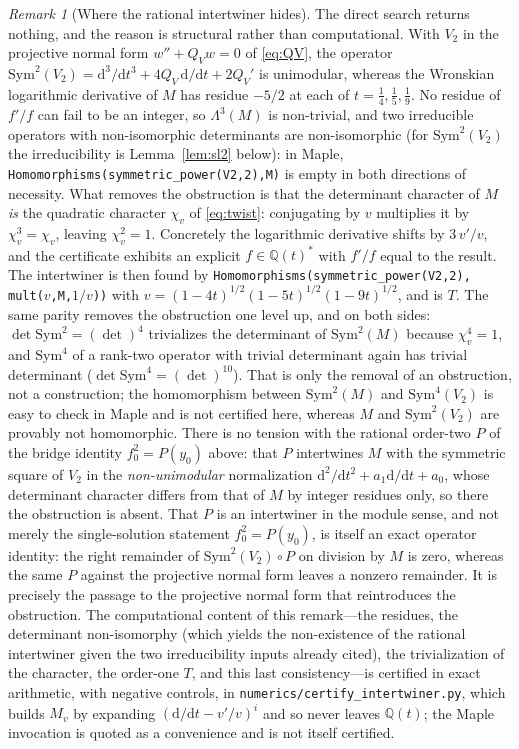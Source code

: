 \documentclass[cntp]{ipart}
\newcommand{\rmd}{\mathrm{d}}
\theoremstyle{plain}
\theoremstyle{remark}
\newtheorem{rem}[thm]{Remark}
\begin{document}
\begin{rem}[Where the rational intertwiner hides]
\label{rem:obstruction}
The direct search returns nothing, and the reason is structural rather than computational. With $V_2$ in the
projective normal form $w''+Q_Vw=0$ of \eqref{eq:QV}, the operator
$\mathrm{Sym}^2(V_2)=\rmd^3/\rmd t^3+4Q_V\,\rmd/\rmd t+2Q_V'$ is unimodular, whereas the Wronskian
logarithmic derivative of $M$ has residue $-5/2$ at each of $t=\tfrac14,\tfrac15,\tfrac19$. No residue of
$f'/f$ can fail to be an integer, so $\Lambda^3(M)$ is non-trivial, and two irreducible operators with
non-isomorphic determinants are non-isomorphic (for $\mathrm{Sym}^2(V_2)$ the irreducibility is
Lemma~\ref{lem:sl2} below): in Maple,
\texttt{Homomorphisms(symmetric\_power(V2,2),M)} is empty in both directions of necessity. What removes the
obstruction is that the determinant character of $M$ \emph{is} the quadratic character $\chi_v$ of
\eqref{eq:twist}: conjugating by $v$ multiplies it by $\chi_v^3=\chi_v$, leaving $\chi_v^2=1$. Concretely the
logarithmic derivative shifts by $3\,v'/v$, and the certificate exhibits an explicit $f\in\mathbb{Q}(t)^*$ with
$f'/f$ equal to the result. The intertwiner is then found by
\texttt{Homomorphisms(symmetric\_power(V2,2),\,mult($v$,M,$1/v$))} with
$v=(1-4t)^{1/2}(1-5t)^{1/2}(1-9t)^{1/2}$, and is $T$. The same parity removes the obstruction one level up, and
on both sides: $\det\mathrm{Sym}^2=(\det)^4$ trivializes the determinant of $\mathrm{Sym}^2(M)$ because
$\chi_v^4=1$, and $\mathrm{Sym}^4$ of a rank-two operator with trivial determinant again has trivial determinant
($\det\mathrm{Sym}^4=(\det)^{10}$).
That is only the removal of an obstruction, not a construction; the homomorphism between
$\mathrm{Sym}^2(M)$ and $\mathrm{Sym}^4(V_2)$ is easy to check in Maple and is not certified here,
whereas $M$ and $\mathrm{Sym}^2(V_2)$ are provably not homomorphic. There is no tension with the rational
order-two $P$ of the bridge identity
$f_0^2=P(y_0)$ above: that $P$ intertwines $M$ with the symmetric square of $V_2$ in the \emph{non-unimodular}
normalization $\rmd^2/\rmd t^2+a_1\rmd/\rmd t+a_0$, whose determinant character differs from that of $M$ by
integer residues only, so there the obstruction is absent. That $P$ is an intertwiner in the module sense,
and not merely the single-solution statement $f_0^2=P(y_0)$, is itself an exact operator identity: the right
remainder of $\mathrm{Sym}^2(V_2)\circ P$ on division by $M$ is zero, whereas the same $P$ against the
projective normal form leaves a nonzero remainder. It is precisely the passage to the projective
normal form that reintroduces the obstruction. The computational content of this remark---the residues, the
determinant non-isomorphy (which yields the non-existence of the rational intertwiner given the two
irreducibility inputs already cited), the trivialization of the character, the order-one $T$, and this
last consistency---is certified in exact arithmetic, with negative controls, in
\texttt{numerics/certify\_intertwiner.py}, which builds $M_v$ by expanding $(\rmd/\rmd t-v'/v)^i$ and so
never leaves $\mathbb{Q}(t)$; the Maple invocation is quoted as a convenience and is not itself certified.
\end{rem}
\end{document}
